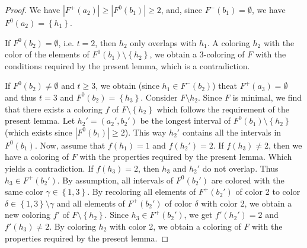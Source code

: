 \documentclass{article}
\theoremstyle{definition}
\begin{document}
\begin{proof}
        We have $\left|F^{+}\left(a_{2}\right)\right| \geq
        \left|F^{0}\left(b_1\right)\right| \geq 2$,
        and, since $F^{-}\left(b_1\right) = \emptyset$,
        we have $F^{0}\left(a_2\right)
        = \left\{h_1\right\}$.
        
        If $F^{0}\left(b_2\right) = \emptyset$,
        i.e. $t=2$, then $h_2$
        only overlaps with $h_1$.
        A coloring $h_2$ with the color
        of the elements of $F^{0}\left(b_1\right)
        \setminus \left\{h_2\right\}$,
        we obtain a 3-coloring of $F$ with
        the conditions required by
        the present lemma, which is a
        contradiction.
        
        If $F^{0}\left(b_2\right) \neq \emptyset$
        and $t \geq 3$,
        we obtain (since $h_1 \in
        F^{-}\left(b_2\right)$)
        theat $F^{+}\left(a_3\right)=\emptyset$ 
        and thus $t=3$
        and $F^{0}\left(b_2\right) = \left\{h_3\right\}$.
        Consider $F \setminus h_2$.
        Since $F$ is minimal,
        we find that there exists
        a coloring $f$ of $F \setminus \left\{h_2\right\}$
        which follows the requirement
        of the present lemma.
        Let $h_2' = \left(a_2', b_2'\right)$
        be the longest interval of 
        $F^{0}\left(b_1\right) \setminus \left\{h_2\right\}$
        (which exists since $\left|F^{0}\left(b_1\right)\right|
        \geq 2$). This way
        $h_2'$ contains all
        the intervals in
        $F^{0}\left(b_1\right)$.
        Now, assume that $f\left(h_1\right) = 1$
        and $f\left(h_2'\right) = 2$.
        If $f\left(h_3\right)\neq 2$,
        then we have a coloring 
        of $F$ with the properties
        required by the present lemma.
        Which yields a contradiction.
        If $f\left(h_3\right) = 2$,
        then $h_3$ and $h_2'$
        do not overlap. Thus $h_3 \in F^{+}\left(b_2'\right)$.
        By assumption, all intervals
        of $F^{0}\left(b_2'\right)$ 
        are colored with the same color
        $\gamma \in \left\{1,3\right\}$.
        By recoloring all elements
        of $F^{+}\left(b_2'\right)$
        of color 2 to color 
        $\delta \in \left\{1,3\right\}
        \setminus \gamma$
        and all elements of $F^{+}\left(b_2'\right)$ 
        of color $\delta$ with color 2,
        we obtain a 
        new coloring $f'$ of 
        $F \setminus \left\{h_2\right\}$.  Since $h_3 \in F^{+}\left(b_2'\right)$,
         we get
        $f'\left(h_2'\right)=2$ and
        $f'\left(h_3\right) \neq 2$.
        By coloring $h_2$ with
        color 2, we obtain a coloring
        of $F$ with the properties
        required by the present lemma.
    \end{proof}
    
\end{document}
